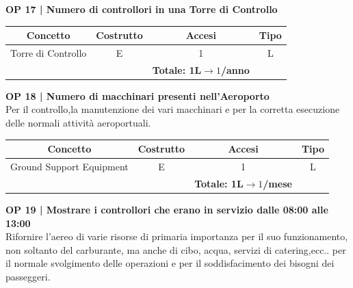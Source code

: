 \vspace{.6cm}


\textbf{\small OP 17 | Numero di controllori in una Torre di Controllo}\\

\begin{tabular}{ c c c c}
	\hline
	\textbf{Concetto} & \textbf{Costrutto} & \textbf{Accesi} & \textbf{Tipo}\\
	\hline
	\textsf{\small Torre di Controllo} & \textsf{\small E} & \textsf{\small 1} &  \textsf{\small L}\\
	\hline
	\textsf{\small } & \textsf{\small } & \textbf{Totale: 1L$\rightarrow 1$/anno } \textsf{\small } & \textsf{\small }\\
	\hline
\end{tabular}

\vspace{.6cm}


\textbf{\small OP 18 | Numero di macchinari presenti nell'Aeroporto}\\

\textsf{\small Per il controllo,la manutenzione dei vari macchinari e per la corretta esecuzione delle normali attività aeroportuali.}\break

\begin{tabular}{ c c c c}
	\hline
	\textbf{Concetto} & \textbf{Costrutto} & \textbf{Accesi} & \textbf{Tipo}\\
	\hline
	\textsf{\small Ground Support Equipment } & \textsf{\small E} & \textsf{\small 1} &  \textsf{\small L}\\
	\hline
	\textsf{\small } & \textsf{\small } & \textbf{Totale: 1L$\rightarrow 1$/mese } \textsf{\small } & \textsf{\small }\\
	\hline
\end{tabular}

\vspace{.6cm}


\textbf{\small OP 19 | Mostrare i controllori che erano in servizio dalle 08:00 alle 13:00}\\

\textsf{\small Rifornire l'aereo di varie risorse di primaria importanza per il suo funzionamento, non soltanto del carburante, ma anche di cibo, acqua, servizi di catering,ecc.. per il normale svolgimento delle operazioni e per il soddisfacimento dei bisogni dei passeggeri.}\break

